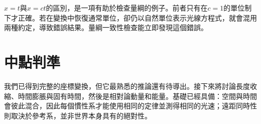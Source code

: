 \(x=t\)與\(x=ct\)的區別，是一項有助於檢查量綱的例子。前者只有在\(c=1\)的單位制下才正確。若在變換中恢復通常單位，卻仍以自然單位表示光線方程式，就會混用兩種約定，導致錯誤結果。量綱一致性檢查能立即發現這個錯誤。

\section{中點判準}

\begin{classroomqa}
\end{classroomqa}

我們已得到完整的座標變換，但它最熟悉的推論還有待導出。接下來將討論長度收縮、時間膨脹與固有時間，然後是相對論動量和能量。基礎已經具備：空間與時間會彼此混合，因此每個慣性系才能使用相同的定律並測得相同的光速；遠距同時性則取決於參考系，並非世界本身具有的絕對性。